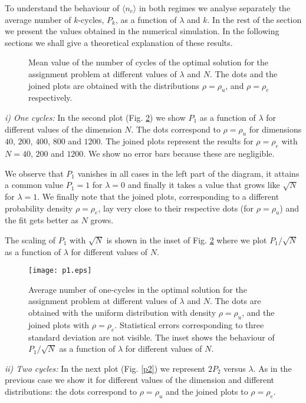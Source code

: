 \documentclass[]{iopart}
\begin{document}
To understand the behaviour of $\langle n_c\rangle$ in both regimes
we analyse separately the average number of $k$-cycles, $P_k$, 
as a function of $\lambda$ and $k$.
In the rest of the section we present the values
obtained in the numerical simulation.  In the following 
sections we shall give a theoretical explanation of these results.
 
\begin{figure}[h!]
\caption{\small Mean value of the number of cycles of the optimal solution for
  the assignment problem at different values of $\lambda$ and $N$.
The dots and the joined plots are obtained with the distributions 
$\rho = \rho_u$, 
 and
$\rho = \rho_e$ respectively. }
\label{fig1}
\end{figure}


{\it i) One cycles:}
In the second plot (Fig. \ref{p1}) we show $P_1$ as a function of $\lambda$ 
for different values of the dimension $N$. The dots
correspond to $\rho=\rho_u$ for dimensions $40$, $200$, $400$, 
$800$ and $1200$. The joined plots represent the results for
$\rho=\rho_e$ with $N=40$, $200$ and $1200$. We show no error bars 
because these are negligible. 

We observe that $P_1$ vanishes in all cases in the left part
of the diagram, it attains a common value $P_1=1$ for 
$\lambda=0$ and finally it takes a value 
that grows like $\sqrt N$ for $\lambda = 1$.
We finally note that the joined plots, corresponding 
to a different probability density $\rho=\rho_e$,
lay very close to their respective dots
(for $\rho=\rho_u$) and the fit 
gets better as $N$ grows.

The scaling of $P_1$ with $\sqrt N$ is shown 
 in the inset of Fig. \ref{p1} where  we 
plot $P_1/\sqrt N$  as a function of $\lambda$ 
for different values of $N$. 

\begin{figure}[h!]
{
\texttt{[image: p1.eps]}}
\caption{\small Average number of one-cycles in the optimal solution for
  the assignment problem at different values of $\lambda$ and $N$. 
The dots are obtained with the uniform distribution with density 
$\rho = \rho_u$, 
and the joined plots with
$\rho = \rho_e$. Statistical errors corresponding to three standard 
deviation are not visible. The inset shows the behaviour of $P_1 / \sqrt{N}$
 as a function of $\lambda$ for
 different values of $N$.}
\label{p1}
\end{figure}


{\it ii) Two cycles:}
In the next plot (Fig. \ref{p2}) we represent $2P_2$ versus $\lambda$.
As in the previous case we show it for different
values of the dimension and different distributions:
the dots correspond to $\rho=\rho_u$ and the joined plots
 to $\rho=\rho_e$. 
\end{document}

